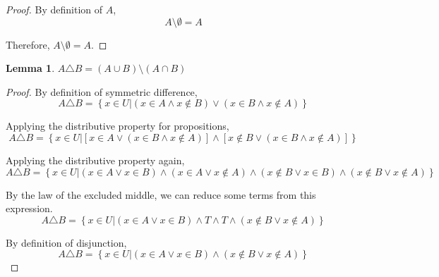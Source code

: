 \documentclass{article}
\newtheorem{lemma}{Lemma}
\begin{document}
\begin{outline}[enumerate]
\begin{proof}
        By definition of $A$, 
        \begin{equation}
            A \setminus \emptyset = A
        \end{equation}

        Therefore, $A \setminus \emptyset = A$.
    \end{proof}

    \begin{lemma}
        $A \triangle B = (A \cup B) \setminus (A \cap B)$
        \label{lem:xor}
    \end{lemma}

    \begin{proof}
        By definition of symmetric difference, 
        \begin{equation}
            A \triangle B = \left\{x \in U | (x \in A \wedge x \notin B) \vee (x \in B \wedge x \notin A)\right\}
        \end{equation}
        
        Applying the distributive property for propositions,
        \begin{equation}
            A \triangle B = \left\{x \in U | 
                \left[x \in A \vee (x \in B \wedge x \notin A)\right] \wedge 
                \left[x \notin B \vee (x \in B \wedge x \notin A)\right]
            \right\}
        \end{equation}

        Applying the distributive property again,
        \begin{equation}
            A \triangle B = \left\{x \in U | 
                (x \in A \vee x \in B) \wedge (x \in A \vee x \notin A)
                \wedge 
                (x \notin B \vee x \in B) \wedge (x \notin B \vee x \notin A)
            \right\}
        \end{equation}

        By the law of the excluded middle, we can reduce some terms from this expression.
        \begin{equation}
            A \triangle B = \left\{x \in U | 
                (x \in A \vee x \in B) \wedge T \wedge T
                \wedge (x \notin B \vee x \notin A)
            \right\}
        \end{equation}

        By definition of disjunction,
        \begin{equation}
            A \triangle B = \left\{x \in U | 
                (x \in A \vee x \in B)
                \wedge (x \notin B \vee x \notin A)
            \right\}
        \end{equation}


\end{proof}
\end{outline}
\end{document}
